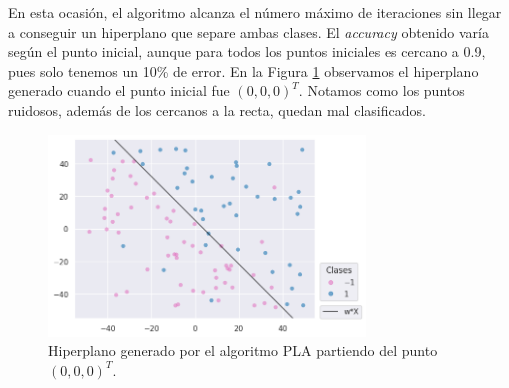 \documentclass[a4paper, 20pt]{article}
\begin{document}
En esta ocasión, el algoritmo alcanza el número máximo de iteraciones sin llegar a conseguir un hiperplano que separe ambas clases. El \textit{accuracy} obtenido varía según el punto inicial, aunque para todos los puntos iniciales es cercano a 0.9, pues solo tenemos un 10\% de error. En la Figura \ref{fig:21ruido} observamos el hiperplano generado cuando el punto inicial fue $(0,0,0)^T$. Notamos como los puntos ruidosos, además de los cercanos a la recta, quedan mal clasificados. 

\begin{figure}[H]
    \centering
    \includegraphics[width=0.75\textwidth]{21ruido}
    \caption{Hiperplano generado por el algoritmo PLA partiendo del punto $(0,0,0)^T$.}
    \label{fig:21ruido}
\end{figure}

\newpage
\printbibliography
\end{document}
